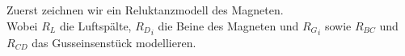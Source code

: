\newpage
				\beginip
		Zuerst zeichnen wir ein Reluktanzmodell des Magneten. \\
		Wobei $R_L$ die Luftspälte, ${R_D}_i$ die Beine des Magneten und ${R_G}_i$ sowie $R_{BC}$ und $R_{CD}$ das Gusseinsenstück modellieren.
	\begin{center}
			\end{center}



